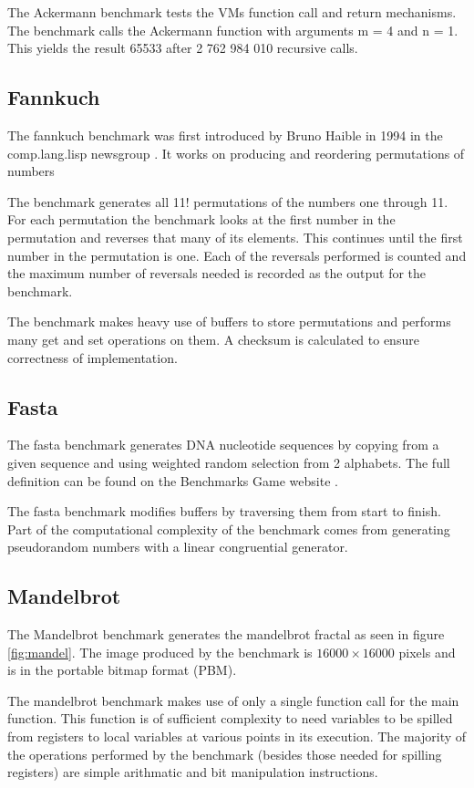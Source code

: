 \documentclass[english,a4paper,12pt]{report}
\begin{document}
The Ackermann benchmark tests the VMs function call and return
mechanisms. The benchmark calls the Ackermann function with arguments
m = 4 and n = 1. This yields the result 65533 after 2 762 984 010
recursive calls.

\subsection{Fannkuch}

The fannkuch benchmark was first introduced by Bruno Haible in 1994 in
the comp.lang.lisp newsgroup \cite{fannkuch}. It works on producing
and reordering permutations of numbers

The benchmark generates all 11! permutations of the numbers one
through 11. For each permutation the benchmark looks at the first
number in the permutation and reverses that many of its elements. This
continues until the first number in the permutation is one. Each of
the reversals performed is counted and the maximum number of reversals
needed is recorded as the output for the benchmark.

The benchmark makes heavy use of buffers to store permutations and
performs many get and set operations on them. A checksum is calculated
to ensure correctness of implementation.

\subsection{Fasta}
The fasta benchmark generates DNA nucleotide sequences by copying from
a given sequence and using weighted random selection from 2
alphabets. The full definition can be found on the Benchmarks Game
website \cite{fasta}.

The fasta benchmark modifies buffers by traversing them from start to
finish. Part of the computational complexity of the benchmark comes
from generating pseudorandom numbers with a linear congruential
generator.

\subsection{Mandelbrot}

The Mandelbrot benchmark generates the mandelbrot fractal as seen in
figure \ref{fig:mandel}. The image produced by the benchmark is
$16 000\times16 000$ pixels and is in the portable bitmap format (PBM).

The mandelbrot benchmark makes use of only a single function call for
the main function. This function is of sufficient complexity to need
variables to be spilled from registers to local variables at various
points in its execution. The majority of the operations performed by
the benchmark (besides those needed for spilling registers) are simple
arithmatic and bit manipulation instructions.
\end{document}
